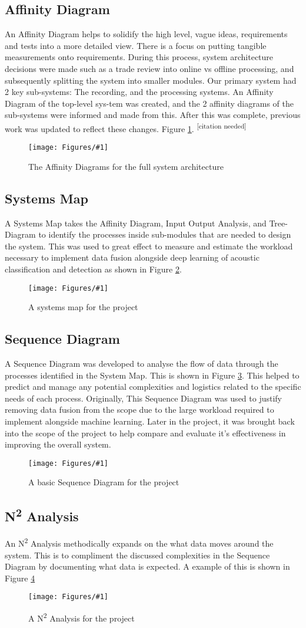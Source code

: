 \documentclass{UoNMCHA}
\newcommand{\citationneeded}{\textsuperscript{\color{blue} [citation needed]}}
\newcommand{\fref}[1] {Figure \ref{#1}}
\newcommand{\fFigure}[3]{
	\begin{figure}[h]
        \begin{center}  
            \texttt{[image: Figures/\#1]}  
            \caption{#2}
            \label{#1}
        \end{center}
	\end{figure}
}
\numberwithin{equation}{section}
\begin{document}
\subsection{Affinity Diagram}
An Affinity Diagram helps to solidify the high level, vague ideas, requirements and tests into a more detailed view. There is a focus on putting tangible measurements onto requirements. During this process, system architecture decisions were made such as a trade review into online vs offline processing, and subsequently splitting the system into smaller modules. Our primary system had 2 key sub-systems: The recording, and the processing systems. An Affinity Diagram of the top-level sys-tem was created, and the 2 affinity diagrams of the sub-systems were informed and made from this. After this was complete, previous work was updated to reflect these changes. \fref{AffinityDiagram.png}. \citationneeded
\fFigure{AffinityDiagram.png}{The Affinity Diagrams for the full system architecture}{1}

\subsection{Systems Map}
A Systems Map takes the Affinity Diagram, Input Output Analysis, and Tree-Diagram to identify the processes inside sub-modules that are needed to design the system. This was used to great effect to measure and estimate the workload necessary to implement data fusion alongside deep learning of acoustic classification and detection as shown in \fref{SystemMap.png}.
\fFigure{SystemMap.png}{A systems map for the project}{0.8}


\subsection{Sequence Diagram}
A Sequence Diagram was developed to analyse the flow of data through the processes identified in the System Map. This is shown in \fref{SequenceDiagram.png}. This helped to predict and manage any potential complexities and logistics related to the specific needs of each process. 
Originally, This Sequence Diagram was used to justify removing data fusion from the scope due to the large workload required to implement alongside machine learning. Later in the project, it was brought back into the scope of the project to help compare and evaluate it's effectiveness in improving the overall system. 
\fFigure{SequenceDiagram.png}{A basic Sequence Diagram for the project}{0.8}


\subsection{N\textsuperscript{2} Analysis}
An N\textsuperscript{2} Analysis methodically expands on the what data moves around the system. This is to compliment the discussed complexities in the Sequence Diagram by documenting what data is expected. A example of this is shown in \fref{n2analysis.png}
\fFigure{n2analysis.png}{A N\textsuperscript{2} Analysis for the project}{0.8}
\end{document}
